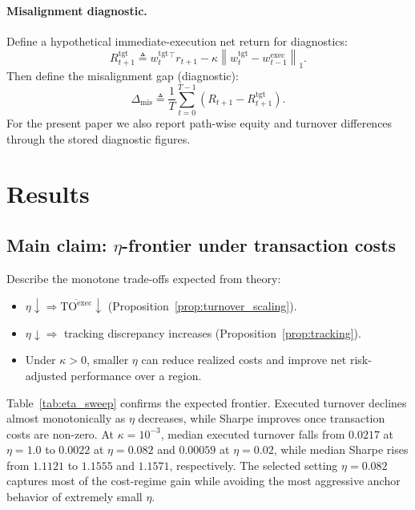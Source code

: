 \documentclass[10pt,twocolumn]{article}
\newcommand{\wexec}{w^{\mathrm{exec}}}
\newcommand{\wtgt}{w^{\mathrm{tgt}}}
\newcommand{\TOexec}{\mathrm{TO}^{\mathrm{exec}}}
\newcommand{\kappaTC}{\kappa}
\newcommand{\normone}[1]{\left\lVert #1 \right\rVert_1}
\begin{document}
\paragraph{Misalignment diagnostic.}
Define a hypothetical immediate-execution net return for diagnostics:
\[
R^{\mathrm{tgt}}_{t+1} \triangleq \wtgt_t^\top r_{t+1} - \kappaTC \normone{\wtgt_t-\wexec_{t-1}}.
\]
Then define the misalignment gap (diagnostic):
\[
\Delta_{\mathrm{mis}} \triangleq \frac{1}{T}\sum_{t=0}^{T-1}\left(R_{t+1} - R^{\mathrm{tgt}}_{t+1}\right).
\]
For the present paper we also report path-wise equity and turnover differences through the stored diagnostic figures.

\section{Results}
\label{sec:results}

\subsection{Main claim: $\eta$-frontier under transaction costs}
Describe the monotone trade-offs expected from theory:
\begin{itemize}[leftmargin=*,itemsep=1pt]
\item $\eta \downarrow \Rightarrow \overline{\TOexec}\downarrow$ (Proposition~\ref{prop:turnover_scaling}).
\item $\eta \downarrow \Rightarrow$ tracking discrepancy increases (Proposition~\ref{prop:tracking}).
\item Under $\kappaTC>0$, smaller $\eta$ can reduce realized costs and improve net risk-adjusted performance over a region.
\end{itemize}
Table~\ref{tab:eta_sweep} confirms the expected frontier. Executed turnover declines almost monotonically as $\eta$ decreases, while Sharpe improves once transaction costs are non-zero. At $\kappa=10^{-3}$, median executed turnover falls from $0.0217$ at $\eta=1.0$ to $0.0022$ at $\eta=0.082$ and $0.00059$ at $\eta=0.02$, while median Sharpe rises from $1.1121$ to $1.1555$ and $1.1571$, respectively. The selected setting $\eta=0.082$ captures most of the cost-regime gain while avoiding the most aggressive anchor behavior of extremely small $\eta$.
\end{document}
